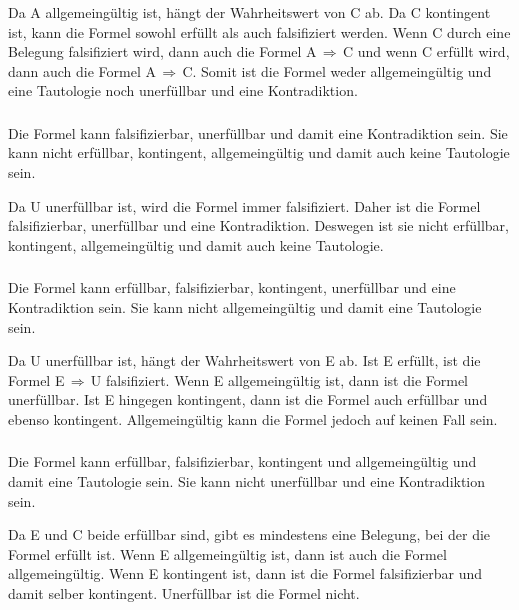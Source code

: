 \documentclass[10pt,a4paper,oneside,ngerman,numbers=noenddot]{scrartcl}
\begin{document}
Da A allgemeingültig ist, hängt der Wahrheitswert von C ab. Da C kontingent ist, kann die Formel sowohl erfüllt als auch falsifiziert werden. Wenn C durch eine Belegung falsifiziert wird, dann auch die Formel A$\, \Rightarrow \,$C und wenn C erfüllt wird, dann auch die Formel A$\, \Rightarrow \,$C.
Somit ist die Formel weder allgemeingültig und eine Tautologie noch unerfüllbar und eine Kontradiktion.
\subsubsection{} %
Die Formel kann falsifizierbar, unerfüllbar und damit eine Kontradiktion sein. Sie kann nicht erfüllbar, kontingent, allgemeingültig und damit auch keine Tautologie sein.

Da U unerfüllbar ist, wird die Formel immer falsifiziert. Daher ist die Formel falsifizierbar, unerfüllbar und eine Kontradiktion. Deswegen ist sie nicht erfüllbar, kontingent, allgemeingültig und damit auch keine Tautologie.
\subsubsection{} %
Die Formel kann erfüllbar, falsifizierbar, kontingent, unerfüllbar und eine Kontradiktion sein. Sie kann nicht allgemeingültig und damit eine Tautologie sein.

Da U unerfüllbar ist, hängt der Wahrheitswert von E ab. Ist E erfüllt, ist die Formel E$\, \Rightarrow \,$U falsifiziert. Wenn E allgemeingültig ist, dann ist die Formel unerfüllbar. Ist E hingegen kontingent, dann ist die Formel auch erfüllbar und ebenso kontingent. Allgemeingültig kann die Formel jedoch auf keinen Fall sein.
\subsubsection{} %
Die Formel kann erfüllbar, falsifizierbar, kontingent und allgemeingültig und damit eine Tautologie sein. Sie kann nicht unerfüllbar und eine Kontradiktion sein.

Da E und C beide erfüllbar sind, gibt es mindestens eine Belegung, bei der die Formel erfüllt ist. Wenn E allgemeingültig ist, dann ist auch die Formel allgemeingültig. Wenn E kontingent ist, dann ist die Formel falsifizierbar und damit selber kontingent. 
Unerfüllbar ist die Formel nicht.
\section{} %
\end{document}
